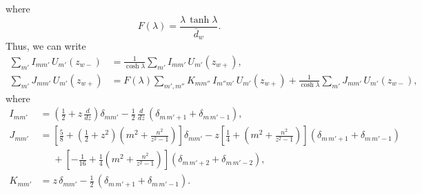 \documentclass[12pt,prb,aps,notitlepage]{revtex4-1}
\begin{document}
where
\begin{equation}
F(\lambda)= \frac{\lambda\,\tanh\lambda}{\bar{d}_w}.
\end{equation}
Thus, we can write
\begin{align}
\sum_{m'}I_{mm'}\,U_{m'}(z_{w-}) &= \frac{1}{\cosh\lambda}\sum_{m'}I_{mm'}\,U_{m'}(z_{w+}),\\[0.5ex]
\sum_{m'}J_{mm'}\,U_{m'}(z_{w+})&= F(\lambda)\sum_{m',m''}K_{mm''}\,I_{m''m'}\,U_{m'}(z_{w+}) + \frac{1}{\cosh\lambda}\sum_{m'}J_{mm'}\,U_{m'}(z_{w-}),
\end{align}
where
\begin{align}
I_{mm'}&= \left(\frac{1}{2}+z\,\frac{d}{dz}\right)\delta_{mm'}-\frac{1}{2}\,\frac{d}{dz}\,(\delta_{m\,m'+1}+\delta_{m\,m'-1}),\\[0.5ex]
J_{mm'}&= \left[\frac{5}{8} + \left(\frac{1}{2}+z^2\right)\left(m^2+\frac{n^2}{z^2-1}\right)\right]\delta_{mm'}
-z\left[\frac{1}{4}+ \left(m^2+\frac{n^2}{z^2-1}\right)\right](\delta_{m\,m'+1}+\delta_{m\,m'-1})\nonumber\\[0.5ex]
&\phantom{=}+\left[-\frac{1}{16}+\frac{1}{4} \left(m^2+\frac{n^2}{z^2-1}\right)\right](\delta_{m\,m'+2}+\delta_{m\,m'-2}),\\[0.5ex]
K_{mm'} &= z\,\delta_{mm'} - \frac{1}{2}\,(\delta_{m\,m'+1}+\delta_{m\,m'-1}).
\end{align}
\end{document}
